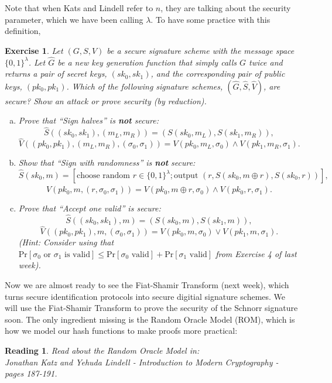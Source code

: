 \documentclass[12pt]{article}
\newcommand{\pr}[1]{\text{Pr}\left[#1\right]}
\newtheorem{exercise}{Exercise}
\newtheorem{reading}{Reading}
\theoremstyle{definition}
\theoremstyle{remark}
\theoremstyle{definition}
\begin{document}
Note that when Kats and Lindell refer to $n$, they are talking about the security parameter, which we have been calling $\lambda$. To have some practice with this definition,

\begin{exercise}
Let $(G, S, V)$ be a secure signature scheme with the message space $\{0,1\}^\lambda$. Let $\hat{G}$ be a new key generation function that simply calls $G$ twice and returns a pair of secret keys, $(sk_0, sk_1)$, and the corresponding pair of public keys, $(pk_0, pk_1)$. Which of the following signature schemes, $(\hat{G}, \hat{S}, \hat{V})$, are secure? Show an attack or prove security (by reduction).
\begin{enumerate}[(a)]
\item Prove that ``Sign halves'' is \textbf{not} secure: $$\hat{S}((sk_0, sk_1), (m_L, m_R)) = (S(sk_0, m_L), S(sk_1, m_R)),$$ $$\hat{V}((pk_0, pk_1), (m_L, m_R), (\sigma_0, \sigma_1)) = V(pk_0, m_L, \sigma_0)\wedge V(pk_1, m_R, \sigma_1).$$
\item Show that ``Sign with randomness'' is \textbf{not} secure: $$\hat{S}(sk_0, m) = [\text{choose random }r\in\{0,1\}^\lambda; \text{output }(r, S(sk_0, m\oplus r), S(sk_0, r))],$$ $$\hat{V}(pk_0, m, (r, \sigma_0, \sigma_1)) = V(pk_0, m\oplus r, \sigma_0)\wedge V(pk_0, r, \sigma_1).$$
\item Prove that ``Accept one valid'' is secure: $$\hat{S}((sk_0, sk_1), m) = (S(sk_0, m), S(sk_1, m)),$$ $$\hat{V}((pk_0, pk_1), m, (\sigma_0, \sigma_1)) = V(pk_0, m, \sigma_0)\vee V(pk_1, m, \sigma_1).$$ (Hint: Consider using that $\pr{\sigma_0\text{ or }\sigma_1\text{ is valid}} \leq \pr{\sigma_0\text{ valid}} + \pr{\sigma_1\text{ valid}}$ from Exercise 4 of last week).
\end{enumerate}
\end{exercise}

Now we are almost ready to see the Fiat-Shamir Transform (next week), which turns secure identification protocols into secure digitial signature schemes. We will use the Fiat-Shamir Transform to prove the security of the Schnorr signature soon. The only ingredient missing is the Random Oracle Model (ROM), which is how we model our hash functions to make proofs more practical:

\begin{reading}
Read about the Random Oracle Model in:\\
Jonathan Katz and Yehuda Lindell - Introduction to Modern Cryptography - pages 187-191.
\end{reading}
\end{document}
